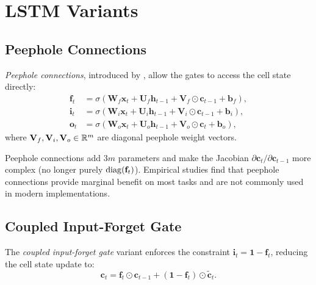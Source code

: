 \documentclass[11pt,a4paper]{article}
\begin{document}
\section{LSTM Variants}
\label{sec:variants}

\subsection{Peephole Connections}

\begin{definition}
\label{def:peephole}
\emph{Peephole connections}, introduced by \citet{gers2000}, allow
the gates to access the cell state directly:
\begin{align}
  \mathbf{f}_t &= \sigma(\mathbf{W}_f \mathbf{x}_t +
    \mathbf{U}_f \mathbf{h}_{t-1} +
    \mathbf{V}_f \odot \mathbf{c}_{t-1} + \mathbf{b}_f),
    \label{eq:peep-f} \\
  \mathbf{i}_t &= \sigma(\mathbf{W}_i \mathbf{x}_t +
    \mathbf{U}_i \mathbf{h}_{t-1} +
    \mathbf{V}_i \odot \mathbf{c}_{t-1} + \mathbf{b}_i),
    \label{eq:peep-i} \\
  \mathbf{o}_t &= \sigma(\mathbf{W}_o \mathbf{x}_t +
    \mathbf{U}_o \mathbf{h}_{t-1} +
    \mathbf{V}_o \odot \mathbf{c}_t + \mathbf{b}_o),
    \label{eq:peep-o}
\end{align}
where $\mathbf{V}_f, \mathbf{V}_i, \mathbf{V}_o \in \mathbb{R}^m$ are
diagonal peephole weight vectors.
\end{definition}

\begin{remark}
Peephole connections add $3m$ parameters and make the Jacobian
$\partial \mathbf{c}_t / \partial \mathbf{c}_{t-1}$ more complex
(no longer purely $\operatorname{diag}(\mathbf{f}_t)$).  Empirical studies
\citep{greff2017} find that peephole connections provide marginal
benefit on most tasks and are not commonly used in modern
implementations.
\end{remark}

\subsection{Coupled Input-Forget Gate}

\begin{definition}
\label{def:coupled}
The \emph{coupled input-forget gate} variant enforces the constraint
$\mathbf{i}_t = \mathbf{1} - \mathbf{f}_t$, reducing the cell state
update to:
\begin{equation}
  \mathbf{c}_t = \mathbf{f}_t \odot \mathbf{c}_{t-1} +
    (\mathbf{1} - \mathbf{f}_t) \odot \tilde{\mathbf{c}}_t.
  \label{eq:coupled}
\end{equation}
\end{definition}
\end{document}
